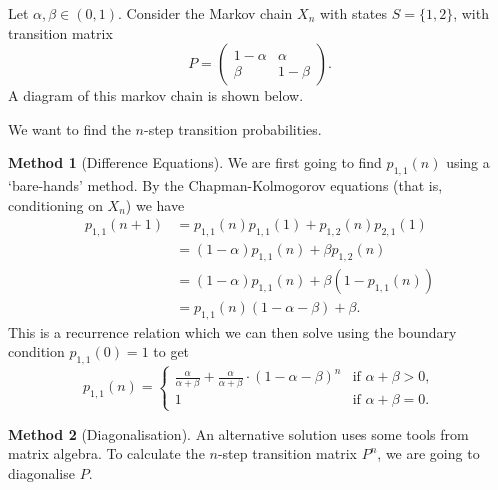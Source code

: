 \documentclass[a4paper]{scrartcl}
\begin{document}
\begin{example}
	Let $\alpha, \beta \in (0, 1)$. 
	Consider the Markov chain $X_n$ with states $S = \{1, 2\}$, with transition matrix 
	$$
	P = \begin{pmatrix}
		1 - \alpha & \alpha \\
		\beta & 1 - \beta
	\end{pmatrix}.
	$$
	A diagram of this markov chain is shown below.
	\begin{center}
	\end{center}

	We want to find the $n$-step transition probabilities.

	\textbf{Method 1} (Difference Equations). We are first going to find $p_{1, 1}(n)$ using a `bare-hands' method. By the Chapman-Kolmogorov equations (that is, conditioning on $X_n$) we have
	\begin{align*}
		p_{1, 1}(n + 1) &= p_{1, 1}(n)p_{1, 1}(1) + p_{1, 2}(n) p_{2, 1}(1) \\
		&= (1 - \alpha)p_{1, 1}(n) + \beta p_{1, 2}(n) \\
		&= (1 - \alpha)p_{1, 1}(n) + \beta (1 - p_{1, 1}(n)) \\
		&= p_{1, 1}(n)(1 - \alpha - \beta) + \beta.
	\end{align*}
	This is a recurrence relation which we can then solve using the boundary condition $p_{1, 1}(0) = 1$ to get
	$$
		p_{1, 1}(n) = \begin{cases}
			\frac{\alpha}{\alpha+\beta}+\frac{\alpha}{\alpha+\beta} \cdot(1-\alpha-\beta)^{n} &\mbox{if } \alpha + \beta > 0, \\
			1 &\mbox{if } \alpha + \beta = 0.
		   \end{cases}
	$$

	\textbf{Method 2} (Diagonalisation). An alternative solution uses some tools from matrix algebra. To calculate the $n$-step transition matrix $P^n$, we are going to diagonalise $P$.


\end{example}
\end{document}
